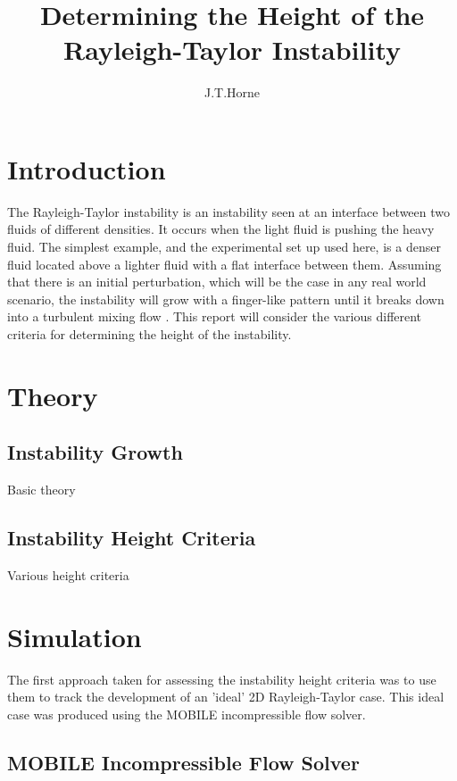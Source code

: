 \documentclass[11pt]{article}
\title{Determining the Height of the Rayleigh-Taylor Instability}
\author{J.T.Horne}
\begin{document}
\maketitle	

\section*{Introduction}

The Rayleigh-Taylor instability is an instability seen at an interface between two fluids of different densities. It occurs when the light fluid is pushing the heavy fluid. The simplest example, and the experimental set up used here, is a denser fluid located above a lighter fluid with a flat interface between them. Assuming that there is an initial perturbation, which will be the case in any real world scenario, the instability will grow with a finger-like pattern until it breaks down into a turbulent mixing flow \cite{sharp1984RToverview}. This report will consider the various different criteria for determining the height of the instability.

\section*{Theory}

\subsection*{Instability Growth}

Basic theory

\subsection*{Instability Height Criteria}

Various height criteria

\section*{Simulation}

The first approach taken for assessing the instability height criteria was to use them to track the development of an 'ideal' 2D Rayleigh-Taylor case. This ideal case was produced using the MOBILE incompressible flow solver.

\subsection*{MOBILE Incompressible Flow Solver}
\end{document}
